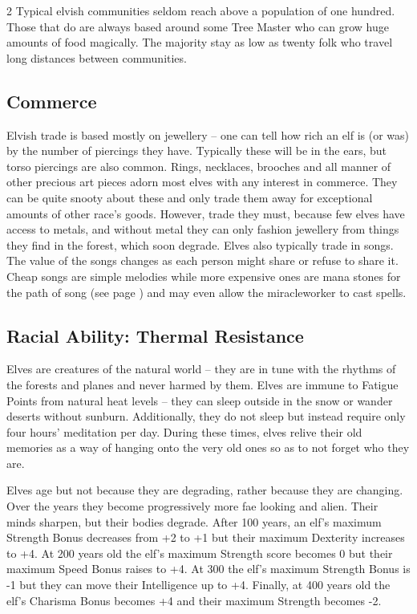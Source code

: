 \begin{multicols}{2}
Typical elvish communities seldom reach above a population of one hundred. Those that do are always based around some Tree Master who can grow huge amounts of food magically. The majority stay as low as twenty folk who travel long distances between communities.

\subsection{Commerce}

Elvish trade is based mostly on jewellery -- one can tell how rich an elf is (or was) by the number of piercings they have. Typically these will be in the ears, but torso piercings are also common. Rings, necklaces, brooches and all manner of other precious art pieces adorn most elves with any interest in commerce. They can be quite snooty about these and only trade them away for exceptional amounts of other race's goods. However, trade they must, because few elves have access to metals, and without metal they can only fashion jewellery from things they find in the forest, which soon degrade. Elves also typically trade in songs. The value of the songs changes as each person might share or refuse to share it. Cheap songs are simple melodies while more expensive ones are mana stones for the path of song (see page \pageref{song}) and may even allow the \gls{miracleworker} to cast spells.

\subsection{Racial Ability: Thermal Resistance}

Elves are creatures of the natural world -- they are in tune with the rhythms of the forests and planes and never harmed by them. Elves are immune to Fatigue Points from natural heat levels -- they can sleep outside in the snow or wander deserts without sunburn. Additionally, they do not sleep but instead require only four hours' meditation per day. During these times, elves relive their old memories as a way of hanging onto the very old ones so as to not forget who they are.

Elves age but not because they are degrading, rather because they are changing. Over the years they become progressively more fae looking and alien. Their minds sharpen, but their bodies degrade. After 100 years, an elf's maximum Strength Bonus decreases from +2 to +1 but their maximum Dexterity increases to +4. At 200 years old the elf's maximum Strength score becomes 0 but their maximum Speed Bonus raises to +4. At 300 the elf's maximum Strength Bonus is -1 but they can move their Intelligence up to +4. Finally, at 400 years old the elf's Charisma Bonus becomes +4 and their maximum Strength becomes -2.


\end{multicols}

